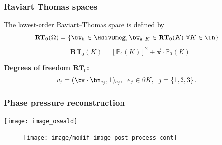 \documentclass[10 pt]{beamer}
\newtheorem{proposition}[theorem]{Proposition}
\begin{document}
\begin{frame}
\frametitle{Raviart Thomas spaces}
\vspace{-0.3 cm}
\begin{definition}
The lowest-order Raviart--Thomas space is defined by
\begin{equation*}
\textbf{RT}_0(\Omega)=\left\{\bw_h \in \HdivOmeg, {\bw_h}|_{K} \in \textbf{RT}_0(K)\ \forall K \in \Th\right\}
\end{equation*}
 \begin{equation*}
 \quad \textbf{RT}_0(K)=[{\mathbb{P}}_0(K)]^2 + \vec{{\bm x}} \cdot  {\mathbb{P}}_0(K)
\end{equation*}
\end{definition}
\vspace{0.3 cm}
\begin{minipage}[c]{0.5 \linewidth}
\begin{figure}
\centering
{}
\end{figure}
\end{minipage}\hfill
\begin{minipage}[c]{0.5 \linewidth}
\textcolor{cadmiumgreen}{\textbf{Degrees of freedom $\textbf{RT}_0$:}} 
\begin{equation*}
v_j=(\bv \cdot \bn_{e_j},1)_{e_j}, \hspace{0.2 cm} e_j \in \partial K, \hspace{0.2 cm} j = \left\{1,2,3\right\}.
\end{equation*}
\end{minipage}

\end{frame}
\begin{frame}
\frametitle{Phase pressure reconstruction}
\centering
\texttt{[image: image\_oswald]}
 
\begin{figure}
\texttt{[image: image/modif\_image\_post\_process\_cont]}   
\end{figure}
\end{frame}
\end{document}
